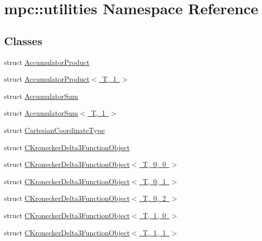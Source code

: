 \hypertarget{namespacempc_1_1utilities}{}\section{mpc\+:\+:utilities Namespace Reference}
\label{namespacempc_1_1utilities}
\subsection*{Classes}
\begin{DoxyCompactItemize}
\item 
struct \mbox{\hyperlink{structmpc_1_1utilities_1_1_accumulator_product}{Accumulator\+Product}}
\item 
struct \mbox{\hyperlink{structmpc_1_1utilities_1_1_accumulator_product_3_01_t_00_011_01_4}{Accumulator\+Product$<$ T, 1 $>$}}
\item 
struct \mbox{\hyperlink{structmpc_1_1utilities_1_1_accumulator_sum}{Accumulator\+Sum}}
\item 
struct \mbox{\hyperlink{structmpc_1_1utilities_1_1_accumulator_sum_3_01_t_00_011_01_4}{Accumulator\+Sum$<$ T, 1 $>$}}
\item 
struct \mbox{\hyperlink{structmpc_1_1utilities_1_1_cartesian_coordinate_type}{Cartesian\+Coordinate\+Type}}
\item 
struct \mbox{\hyperlink{structmpc_1_1utilities_1_1_c_kronecker_delta3_function_object}{C\+Kronecker\+Delta3\+Function\+Object}}
\item 
struct \mbox{\hyperlink{structmpc_1_1utilities_1_1_c_kronecker_delta3_function_object_3_01_t_00_010_00_010_01_4}{C\+Kronecker\+Delta3\+Function\+Object$<$ T, 0, 0 $>$}}
\item 
struct \mbox{\hyperlink{structmpc_1_1utilities_1_1_c_kronecker_delta3_function_object_3_01_t_00_010_00_011_01_4}{C\+Kronecker\+Delta3\+Function\+Object$<$ T, 0, 1 $>$}}
\item 
struct \mbox{\hyperlink{structmpc_1_1utilities_1_1_c_kronecker_delta3_function_object_3_01_t_00_010_00_012_01_4}{C\+Kronecker\+Delta3\+Function\+Object$<$ T, 0, 2 $>$}}
\item 
struct \mbox{\hyperlink{structmpc_1_1utilities_1_1_c_kronecker_delta3_function_object_3_01_t_00_011_00_010_01_4}{C\+Kronecker\+Delta3\+Function\+Object$<$ T, 1, 0 $>$}}
\item 
struct \mbox{\hyperlink{structmpc_1_1utilities_1_1_c_kronecker_delta3_function_object_3_01_t_00_011_00_011_01_4}{C\+Kronecker\+Delta3\+Function\+Object$<$ T, 1, 1 $>$}}

\end{DoxyCompactItemize}
